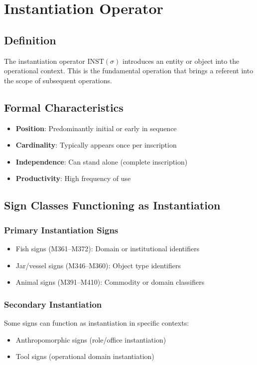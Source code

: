 \section{Instantiation Operator}

\subsection{Definition}

The instantiation operator $\text{INST}(\sigma)$ introduces an entity or object into the operational context. This is the fundamental operation that brings a referent into the scope of subsequent operations.

\subsection{Formal Characteristics}

\begin{itemize}
    \item \textbf{Position}: Predominantly initial or early in sequence
    \item \textbf{Cardinality}: Typically appears once per inscription
    \item \textbf{Independence}: Can stand alone (complete inscription)
    \item \textbf{Productivity}: High frequency of use
\end{itemize}

\subsection{Sign Classes Functioning as Instantiation}

\subsubsection{Primary Instantiation Signs}
\begin{itemize}
    \item Fish signs (M361--M372): Domain or institutional identifiers
    \item Jar/vessel signs (M346--M360): Object type identifiers
    \item Animal signs (M391--M410): Commodity or domain classifiers
\end{itemize}

\subsubsection{Secondary Instantiation}
Some signs can function as instantiation in specific contexts:
\begin{itemize}
    \item Anthropomorphic signs (role/office instantiation)
    \item Tool signs (operational domain instantiation)
\end{itemize}

